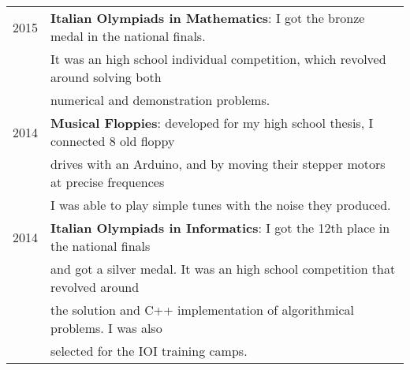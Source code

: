 \documentclass[a4paper,10pt]{article} %
\begin{document}
\begin{tabular}{rl}
2015 &  \textbf{Italian Olympiads in Mathematics}: I got the bronze medal in the national finals. \\
     & It was an high school individual competition, which revolved around solving both \\
     & numerical and demonstration problems. \\
2014 &  \textbf{Musical Floppies}: developed for my high school thesis, I connected 8 old floppy \\
     & drives with an Arduino, and by moving their stepper motors at precise frequences \\
     & I was able to play simple tunes with the noise they produced.\\
2014 &  \textbf{Italian Olympiads in Informatics}: I got the 12th place in the national finals \\
     & and got a silver medal. It was an high school competition that revolved around \\
     & the solution and C++ implementation of algorithmical problems. I was also \\
     & selected for the IOI training camps. \\
\end{tabular}

\end{document}
